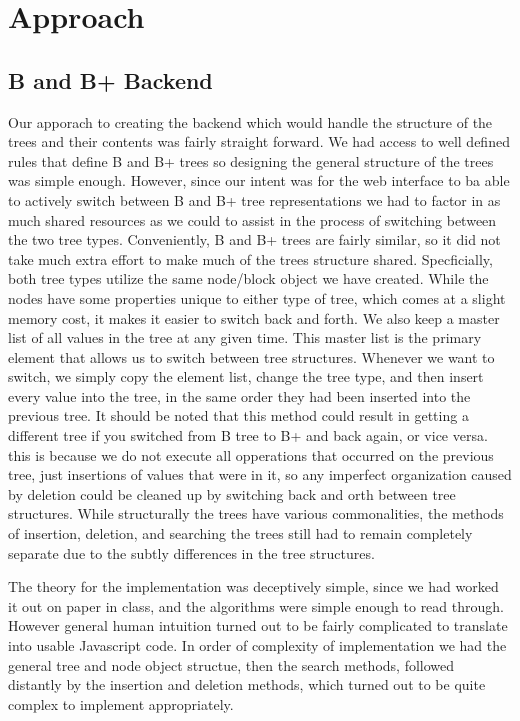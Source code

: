 \section{Approach}

\subsection{B and B+ Backend}
Our apporach to creating the backend which would handle the structure
of the trees and their contents was fairly straight forward.  We had
access to well defined rules that define B and B+ trees so designing
the general structure of the trees was simple enough.  However, since
our intent was for the web interface to ba able to actively switch
between B and B+ tree representations we had to factor in as much
shared resources as we could to assist in the process of switching
between the two tree types.  Conveniently, B and B+ trees are fairly
similar, so it did not take much extra effort to make much of the
trees structure shared.  Specficially, both tree types utilize the
same node/block object we have created.  While the nodes have some
properties unique to either type of tree, which comes at a slight
memory cost, it makes it easier to switch back and forth.  We also
keep a master list of all values in the tree at any given time.  This
master list is the primary element that allows us to switch between
tree structures.  Whenever we want to switch, we simply copy the
element list, change the tree type, and then insert every value into
the tree, in the same order they had been inserted into the previous
tree.  It should be noted that this method could result in getting a
different tree if you switched from B tree to B+ and back again, or
vice versa.  this is because we do not execute all opperations that
occurred on the previous tree, just insertions of values that were in
it, so any imperfect organization caused by deletion could be cleaned
up by switching back and orth between tree structures.  While
structurally the trees have various commonalities, the methods of
insertion, deletion, and searching the trees still had to remain
completely separate due to the subtly differences in the tree
structures.

The theory for the implementation was deceptively simple, since we had
worked it out on paper in class, and the algorithms were simple enough
to read through.  However general human intuition turned out to be
fairly complicated to translate into usable Javascript code.  In order
of complexity of implementation we had the general tree and node
object structue, then the search methods, followed distantly by the
insertion and deletion methods, which turned out to be quite complex
to implement appropriately.

